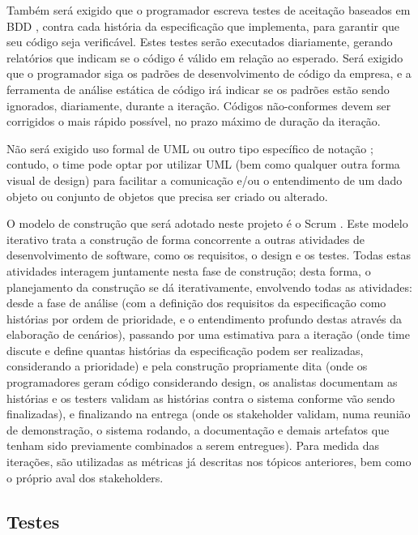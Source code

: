 \documentclass[12pt,journal,compsoc]{IEEEtran}
\begin{document}
Também será exigido que o programador escreva testes de aceitação baseados em BDD \cite{chelimsky2010rspec}, contra cada história da especificação que implementa, para garantir que seu código seja verificável. Estes testes serão executados diariamente, gerando relatórios que indicam se o código é válido em relação ao esperado. Será exigido que o programador siga os padrões de desenvolvimento de código da empresa, e a ferramenta de análise estática de código irá indicar se os padrões estão sendo ignorados, diariamente, durante a iteração. Códigos não-conformes devem ser corrigidos o mais rápido possível, no prazo máximo de duração da iteração.

Não será exigido uso formal de UML ou outro tipo específico de notação \cite{society_software_2004}; contudo, o time pode optar por utilizar UML (bem como qualquer outra forma visual de design) para facilitar a comunicação e/ou o entendimento de um dado objeto ou conjunto de objetos que precisa ser criado ou alterado. %

O modelo de construção que será adotado neste projeto é o Scrum
\cite{schwaber_scrum_2013}. Este modelo iterativo trata a construção de forma
concorrente a outras atividades de desenvolvimento de software, como os
requisitos, o design e os testes. Todas estas atividades interagem juntamente
nesta fase de construção; desta forma, o planejamento da construção se dá
iterativamente, envolvendo todas as atividades: desde a fase de análise (com a
definição dos requisitos da especificação como histórias por ordem de
prioridade, e o entendimento profundo destas através da elaboração de
cenários), passando por  uma estimativa para a iteração (onde time discute e
define quantas histórias da especificação podem ser realizadas, considerando a
prioridade) e pela construção propriamente dita (onde os programadores geram
código considerando design, os analistas documentam as histórias e os testers
validam as histórias contra o sistema conforme vão sendo finalizadas), e
finalizando na entrega (onde os stakeholder validam, numa reunião de
demonstração, o sistema rodando, a documentação e demais artefatos que tenham
sido previamente combinados a serem entregues).  Para medida das iterações, são
utilizadas as métricas já descritas nos tópicos anteriores, bem como o próprio
aval dos stakeholders.


\subsection{Testes}
\end{document}
